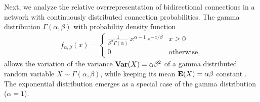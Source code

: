 
Next, we analyze the relative overrepresentation of bidirectional
connections in a network with continuously distributed connection
probabilities. The gamma distribution $\Gamma(\alpha, \beta)$ with
probability density function
\begin{align}
    f_{\alpha,\beta}(x) = \begin{cases} 
\frac{1}{\beta^{\alpha}\Gamma(\alpha)}\, x^{\alpha-1}\,e^{-x/\beta} & x \geq 0 \\
0 & \text{otherwise},
\end{cases}
\end{align}
allows the variation of the variance $\operatorname{\mathbf{Var}}(X)= \alpha \beta^2 $ of a
gamma distributed random variable $X \sim \Gamma(\alpha, \beta)$, while
keeping its mean $\operatorname{\mathbf{E}}(X) = \alpha \beta $ constant \cite{Hogg1978}.
The exponential distribution emerges as a special case of the gamma
distribution ($\alpha =1$).

